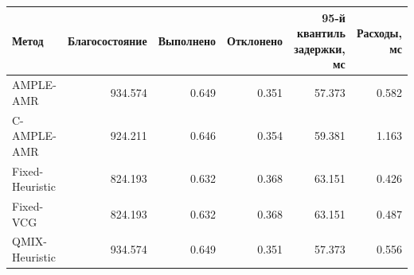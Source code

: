\begin{tabular}{lrrrrr}
\toprule
 Метод & Благосостояние & Выполнено & Отклонено & 95-й квантиль задержки, мс & Расходы, мс \\
\midrule
 AMPLE-AMR & 934.574 & 0.649 & 0.351 & 57.373 & 0.582 \\
 C-AMPLE-AMR & 924.211 & 0.646 & 0.354 & 59.381 & 1.163 \\
 Fixed-Heuristic & 824.193 & 0.632 & 0.368 & 63.151 & 0.426 \\
 Fixed-VCG & 824.193 & 0.632 & 0.368 & 63.151 & 0.487 \\
 QMIX-Heuristic & 934.574 & 0.649 & 0.351 & 57.373 & 0.556 \\
\bottomrule
\end{tabular}
